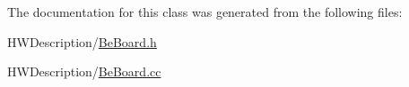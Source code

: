 The documentation for this class was generated from the following files\-:\begin{DoxyCompactItemize}
\item 
H\-W\-Description/\hyperlink{_be_board_8h}{Be\-Board.\-h}\item 
H\-W\-Description/\hyperlink{_be_board_8cc}{Be\-Board.\-cc}\end{DoxyCompactItemize}
